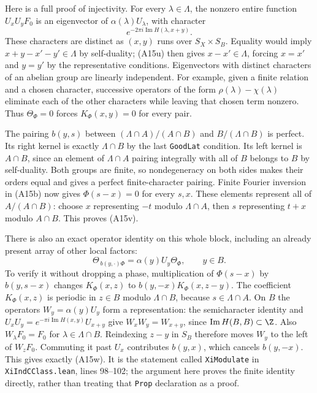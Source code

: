 Here is a full proof of injectivity.  For every $\lambda\in\Lambda$,
the nonzero entire function $U_xU_yF_0$ is an eigenvector of
$\alpha(\lambda)U_\lambda$, with character
\[
             e^{-2\pi i\operatorname{Im}H(\lambda,x+y)}.
\]
These characters are distinct as $(x,y)$ runs over $S_X\times S_B$.
Equality would imply $x+y-x'-y'\in\Lambda$ by self-duality;
(A15u) then gives $x-x'\in\Lambda$, forcing $x=x'$ and $y=y'$
by the representative conditions.  Eigenvectors with distinct
characters of an abelian group are linearly independent.  For
example, given a finite relation and a chosen character, successive
operators of the form $\rho(\lambda)-\chi(\lambda)$ eliminate
each of the other characters while leaving that chosen term
nonzero.  Thus $\Theta_\Phi=0$ forces $K_\Phi(x,y)=0$ for every
pair.

The pairing $b(y,s)$ between
$(\Lambda\cap A)/(A\cap B)$ and $B/(\Lambda\cap B)$ is perfect.
Its right kernel is exactly $\Lambda\cap B$ by the last
\texttt{GoodLat} condition.  Its left kernel is $A\cap B$, since
an element of $\Lambda\cap A$ pairing integrally with all of $B$
belongs to $B$ by self-duality.  Both groups are finite, so
nondegeneracy on both sides makes their orders equal and gives a
perfect finite-character pairing.  Finite Fourier inversion in
(A15b) now gives $\Phi(s-x)=0$ for every $s,x$.
These elements represent all of $A/(A\cap B)$: choose $x$
representing $-t$ modulo $\Lambda\cap A$, then $s$ representing
$t+x$ modulo $A\cap B$.  This proves (A15v).

There is also an exact operator identity on this whole block,
including an already present array of other local factors:
\[
       \Theta_{\,b(y,\cdot)\Phi}
                =\alpha(y)U_y\Theta_\Phi,
                  \qquad y\in B.
 \tag{A15w}
\]
To verify it without dropping a phase, multiplication of $\Phi(s-x)$
by $b(y,s-x)$ changes $K_\Phi(x,z)$ to
$b(y,-x)K_\Phi(x,z-y)$.
The coefficient $K_\Phi(x,z)$ is periodic in
$z\in B$ modulo $\Lambda\cap B$, because $s\in\Lambda\cap A$.
On $B$ the operators $W_y=\alpha(y)U_y$ form a representation:
the semicharacter identity and
$U_xU_y=e^{-\pi i\operatorname{Im}H(x,y)}U_{x+y}$ give
$W_xW_y=W_{x+y}$, since $\operatorname{Im}H(B,B)\subset\Z$.
Also $W_\lambda F_0=F_0$ for $\lambda\in\Lambda\cap B$.
Reindexing $z-y$ in $S_B$ therefore moves $W_y$ to the left of
$W_zF_0$.  Commuting it past $U_x$ contributes $b(y,x)$,
which cancels $b(y,-x)$.  This gives exactly (A15w).
It is the statement called \texttt{XiModulate} in
\texttt{XiIndCClass.lean}, lines 98--102; the argument here proves
the finite identity directly, rather than treating that
\texttt{Prop} declaration as a proof.

